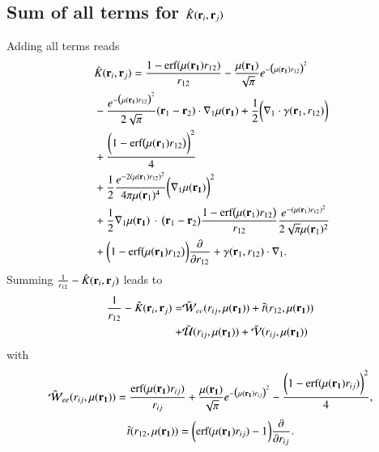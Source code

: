 \documentclass[aip,jcp,reprint,noshowkeys,superscriptaddress]{revtex4-1}
\newcommand{\deriv}[3]{\frac{\partial^{#3} #1}{\partial {#2}^{#3}}}
\newcommand{\br}[0]{{\bf {r}}}
\newcommand{\bri}[1]{{\bf r}_{#1}}
\newcommand{\mur}[1]{\mu({\bf r_{#1}})}
\begin{document}
\subsection{Sum of all terms for $\hat{K}(\bri{i},\bri{j})$ }
Adding all terms reads 
\begin{equation}
 \begin{aligned}
 &\hat{K}(\bri{i},\bri{j}) =  \frac{1 - \text{erf}(\mur{1} r_{12})}{r_{12}} - \frac{\mur{1}}{\sqrt{\pi}} e^{-\big(\mur{1} r_{12} \big)^2} \\
 & -\frac{e^{-\big( \mur{1} r_{12}\big)^2}}{2 \sqrt{\pi}}(\br_1 - \br_2) \cdot \nabla_1 \mur{1} + \frac{1}{2}\bigg(\nabla_1 \cdot {\bf \gamma}(\br_1, r_{12})\bigg) \\
 &  +  \frac{\bigg(1 - \text{erf}\big(\mu(\bri{1}) r_{12} \big)\bigg)^2}{4} \\
 &  +  \frac{1}{2}\frac{e^{-2(\mu(\bri{1}) r_{12})^2}}{4 \pi \mu(\bri{1})^4} \bigg( \nabla_1  \mur{1}\bigg)^2 \\ 
 &  +  \frac{1}{2} \nabla_1  \mur{1} \, \cdot \, \big( \br{}_1 - \br{}_2\big) \frac{1 - \text{erf}\big(\mu(\bri{1}) r_{12} \big)}{r_{12}} \frac{e^{-(\mu(\bri{1}) r_{12})^2}}{2 \sqrt{\pi}\mu(\bri{1})^2} \\ 
 &  + \bigg( 1 - \text{erf}\big(\mur{1} r_{12} \big) \bigg) \deriv{}{r_{12}}{} + {\bf \gamma}(\br_1, r_{12}) \cdot \nabla_1. 
 \end{aligned}
\end{equation}
Summing $\frac{1}{r_{12}} - \hat{K}(\bri{i},\bri{j})$ leads to 
\begin{equation}
 \begin{aligned}
  \frac{1}{r_{12}} - \hat{K}(\bri{i},\bri{j}) = & \tilde{\mathcal{W}}_{ee}(r_{ij},\mur{1}) + \tilde{t}(r_{12},\mur{1}) \\ 
                                              + & \tilde{\mathcal{U}}(r_{ij},\mur{1})
                                              +  \tilde{\mathcal{V}}(r_{ij},\mur{1})
 \end{aligned}
\end{equation}
with 
\begin{equation}
 \begin{aligned}
 \tilde{\mathcal{W}}_{ee}(r_{ij},\mur{1})  =  \frac{\text{erf}(\mur{1} r_{ij})}{r_{ij}} + \frac{\mur{1}}{\sqrt{\pi}} e^{-\big(\mur{1} r_{ij} \big)^2} -      \frac{\bigg(1 -  \text{erf}(\mur{1} r_{ij}) \bigg)^2}{4}, 
 \end{aligned}
\end{equation}
\begin{equation}
 \begin{aligned}                                                                                                                             
 \tilde{t}(r_{12},\mur{1}) =  \bigg( \text{erf}(\mur{1} r_{ij}) - 1\bigg) \deriv{}{r_{ij}}{}.
 \end{aligned}
\end{equation}
\end{document}
